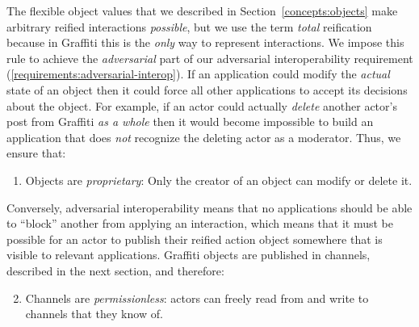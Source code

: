 

The flexible object values that we described in Section~\ref{concepts:objects} make arbitrary reified interactions \emph{possible}, but we use the term \emph{total} reification because in Graffiti this is the \emph{only} way to represent interactions.
We impose this rule to achieve the \emph{adversarial} part of our adversarial interoperability requirement (\ref{requirements:adversarial-interop}).
If an application could modify the \emph{actual} state of an object then it could force all other applications to accept its decisions about the object.
For example, if an actor could actually \emph{delete} another actor's post
from Graffiti \emph{as a whole}
then it would become impossible to build
an application that does \emph{not} recognize the deleting actor as a moderator.
Thus, we ensure that:
\begin{enumerate}
\item
Objects are \emph{proprietary}: Only the creator of an object can modify or delete it.
\end{enumerate}
Conversely, adversarial interoperability means that no applications should be able to ``block'' another from applying an interaction, which means that it must be possible for an actor to publish
their reified action object somewhere that is visible
to relevant applications.
Graffiti objects are published in channels, described in the next
section, and therefore:
\begin{enumerate}
\setcounter{enumi}{1}
\item
Channels are \emph{permissionless}: actors can freely read from and write to channels that they know of.
\end{enumerate}

